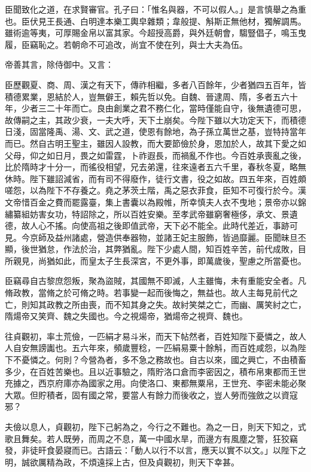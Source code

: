 \begin{pinyinscope}
 臣聞致化之道，在求賢審官。孔子曰：「惟名與器，不可以假人。」是言慎舉之為重也。臣伏見王長通、白明達本樂工輿皁雜類；韋般提、斛斯正無他材，獨解調馬。雖術逾等夷，可厚賜金帛以富其家。今超授高爵，與外廷朝會，騶豎倡子，鳴玉曳履，臣竊恥之。若朝命不可追改，尚宜不使在列，與士大夫為伍。



 帝善其言，除侍御中。又言：



 臣歷觀夏、商、周、漢之有天下，傳祚相繼，多者八百餘年，少者猶四五百年，皆積德累業，恩結於人，豈無僻王，賴先哲以免。自魏、晉逮周、隋，多者五六十年，少者三二十年而亡。良由創業之君不務仁化，當時僅能自守，後無遺德可思，故傳嗣之主，其政少衰，一夫大呼，天下土崩矣。今陛下雖以大功定天下，而積德日淺，固當隆禹、湯、文、武之道，使恩有餘地，為子孫立萬世之基，豈特持當年而已。然自古明王聖主，雖因人設教，而大要節儉於身，恩加於人，故其下愛之如父母，仰之如日月，畏之如雷霆，卜祚遐長，而禍亂不作也。今百姓承喪亂之後，比於隋時才十分一，而徭役相望，兄去弟還，往來遠者五六千里，春秋冬夏，略無休時。陛下雖詔減省，而有司不得廢作，徒行文書，役之如故。四五年來，百姓頗嗟怨，以為陛下不存養之。堯之茅茨土階，禹之惡衣菲食，臣知不可復行於今。漢文帝惜百金之費而罷露臺，集上書囊以為殿帷，所幸慎夫人衣不曳地；景帝亦以錦繡纂組妨害女功，特詔除之，所以百姓安樂。至孝武帝雖窮奢極侈，承文、景遺德，故人心不搖。向使高祖之後即值武帝，天下必不能全。此時代差近，事跡可見。今京師及益州諸處，營造供奉器物，並諸王妃主服飾，皆過靡麗。臣聞昧旦丕顯，後世猶怠，作法於治，其弊猶亂。陛下少處人間，知百姓辛苦，前代成敗，目所親見，尚猶如此，而皇太子生長深宮，不更外事，即萬歲後，聖慮之所當憂也。



 臣竊尋自古黎庶怨叛，聚為盜賊，其國無不即滅，人主雖悔，未有重能安全者。凡脩政教，當脩之於可脩之時。若事變一起而後悔之，無益也。故人主每見前代之亡，則知其政教之所由喪，而不知其身之失。故紂笑桀之亡，而幽、厲笑紂之亡，隋煬帝又笑齊、魏之失國也。今之視煬帝，猶煬帝之視齊、魏也。



 往貞觀初，率土荒儉，一匹絹才易斗米，而天下帖然者，百姓知陛下憂憐之，故人人自安無謗讟也。五六年來，頻歲豐稔，一匹絹易粟十餘斛，而百姓咸怨，以為陛下不憂憐之。何則？今營為者，多不急之務故也。自古以來，國之興亡，不由積畜多少，在百姓苦樂也。且以近事驗之，隋貯洛口倉而李密因之，積布帛東都而王世充據之，西京府庫亦為國家之用。向使洛口、東都無粟帛，王世充、李密未能必聚大眾。但貯積者，固有國之常，要當人有餘力而後收之，豈人勞而強斂之以資寇邪？



 夫儉以息人，貞觀初，陛下己躬為之，今行之不難也。為之一日，則天下知之，式歌且舞矣。若人既勞，而周之不息，萬一中國水旱，而邊方有風塵之警，狂狡竊發，非徒旰食晏寢而已。古語云：「動人以行不以言，應天以實不以文。」以陛下之明，誠欲厲精為政，不煩遠採上古，但及貞觀初，則天下幸甚。




\end{pinyinscope}
